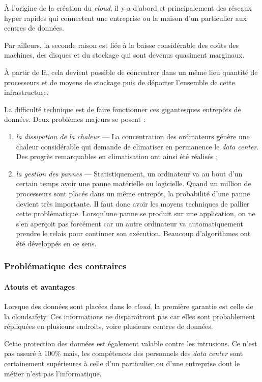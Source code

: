 À l'origine de la création du \textit{cloud}, il y a d'abord et principalement des réseaux hyper rapides qui connectent une entreprise ou la maison d'un particulier aux centres de données.

Par ailleurs, la seconde raison est liée à la baisse considérable des coûts des machines, des disques et du stockage qui sont devenus quasiment marginaux. 

À partir de là, cela devient possible de concentrer dans un même lieu quantité de processeurs et de moyens de stockage puis de déporter l'ensemble de cette infrastructure.

La difficulté technique est de faire fonctionner ces gigantesques entrepôts de données. Deux problèmes majeurs se posent :
\begin{enumerate}
\item \emph{la dissipation de la chaleur} --- La concentration des ordinateurs génère une chaleur considérable qui demande de climatiser en permanence le \textit{data center}. Des progrès remarquables en climatisation ont ainsi été réalisés ;
\item \emph{la gestion des pannes} --- Statistiquement, un ordinateur va au bout d'un certain temps avoir une panne matérielle ou logicielle. Quand un million de processeurs sont placés dans un même entrepôt, la probabilité d'une panne devient très importante. Il faut donc avoir les moyens techniques de pallier cette problématique. Lorsqu'une panne se produit sur une application, on ne s'en aperçoit pas forcément car un autre ordinateur va automatiquement prendre le relais pour continuer son exécution. Beaucoup d'algorithmes ont été développés en ce sens.
\end{enumerate}


\subsubsection[Problématique]{Problématique des contraires}%
\label{subsub:II.2.1.3}


\paragraph*{Atouts et avantages} Lorsque des données sont placées dans le \textit{cloud}, la première garantie est celle de la \gls{cloudsafety}. Ces informations ne disparaîtront pas car elles sont probablement répliquées en plusieurs endroits, voire plusieurs centres de données.

Cette protection des données est également valable contre les intrusions. Ce n'est pas assuré à 100\% mais, les compétences des personnels des \textit{data center} sont certainement supérieures à celle d'un particulier ou d'une entreprise dont le métier n'est pas l'informatique.

